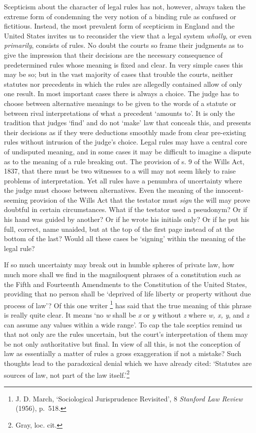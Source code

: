 \documentclass[12pt,oneside]{book}  %
\begin{document}
Scepticism about the character of legal rules has not, however, always
taken the extreme form of condemning the very notion of a binding rule
as confused or fictitious. Instead, the most prevalent form of
scepticism in England and the United States invites us to reconsider the
view that a legal system \emph{wholly}, or even \emph{primarily},
consists of rules. No doubt the courts so frame their judgments as to
give the impression that their decisions are the necessary consequence
of predetermined rules whose meaning is fixed and clear. In very simple
cases this may be so; but in the vast majority of cases that trouble the
courts, neither statutes nor precedents in which the rules are allegedly
contained allow of only one result. In most important cases there is
always a choice. The judge has to choose between alternative meanings to
be given to the words of a statute or between rival interpretations of
what a precedent `amounts to'. It is only the tradition that judges
`find' and do not `make' law that conceals this, and presents their
decisions as if they were deductions smoothly made from clear
pre-existing rules without intrusion of the judge's choice. Legal rules
may have a central core of undisputed meaning, and in some cases it may
be difficult to imagine a dispute as to the meaning of a rule breaking
out. The provision of s. 9 of the Wills Act, 1837, that there must be
two witnesses to a will may not seem likely to raise problems of
interpretation. Yet all rules have a penumbra of uncertainty where the
judge must choose between alternatives. Even the meaning of the
innocent-seeming provision of the Wills Act that the testator must
\emph{sign} the will may prove doubtful in certain circumstances. What
if the testator used a pseudonym? Or if his hand was guided by another?
Or if he wrote his initials only? Or if he put his full, correct, name
unaided, but at the top of the first page instead of at the bottom of
the last? Would all these cases be `signing' within the meaning of the
legal rule?

If so much uncertainty may break out in humble spheres of private law,
how much more shall we find in the magniloquent phrases of a
constitution such as the Fifth and Fourteenth Amendments to the
Constitution of the United States, providing that no person shall be
`deprived of life liberty or property without due process of law'? Of
this one writer \footnote{J. D. March, `Sociological Jurisprudence
  Revisited', 8 \emph{Stanford Law Review} (1956), p.~518.} has said
that the true meaning of this phrase is really quite clear. It means `no
\emph{w} shall be \emph{x} or \emph{y} without \emph{z} where \emph{w,
x, y}, and \emph{z} can assume any values within a wide range'. To cap
the tale sceptics remind us that not only are the rules uncertain, but
the court's interpretation of them may be not only authoritative but
final. In view of all this, is not the conception of law as essentially
a matter of rules a gross exaggeration if not a mistake? Such thoughts
lead to the paradoxical denial which we have already cited: `Statutes
are sources of law, not part of the law itself.'\footnote{Gray, loc.
  cit.}
\end{document}
